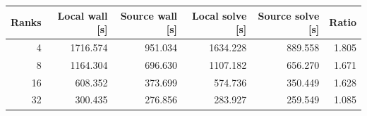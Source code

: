 \begin{tabularx}{\textwidth}{@{}r r r r r r@{}}
\toprule
Ranks & Local wall [s] & Source wall [s] & Local solve [s] & Source solve [s] & Ratio \\
\midrule
4 & 1716.574 & 951.034 & 1634.228 & 889.558 & 1.805 \\
8 & 1164.304 & 696.630 & 1107.182 & 656.270 & 1.671 \\
16 & 608.352 & 373.699 & 574.736 & 350.449 & 1.628 \\
32 & 300.435 & 276.856 & 283.927 & 259.549 & 1.085 \\
\bottomrule
\end{tabularx}
